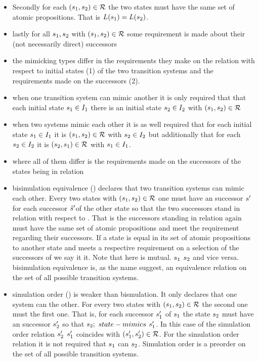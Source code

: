 \documentclass[preview]{standalone}
\begin{document}
\begin{itemize}
	\item Secondly for each $({s}_1, {s}_2) \in {\mathcal{R}}$ the two states must have the same set of atomic propositions. That is ${L}({s}_1) = {L}({s}_2)$.
	\item lastly for all ${s}_1, {s}_2$ with $({s}_1, {s}_2) \in {\mathcal{R}}$ some requirement is made about their (not necessarily direct) successors
	\item the mimicking types differ in the requirements they make on the relation \mimicrel with respect to initial states (1) of the two transition systems and the requirements made on the successors (2).
	\item when one transition system can mimic another it is only required that that each initial state ${s}_1 \in {I}_1$ there is an initial state ${s}_2 \in {I}_2$ with $({s}_1,{s}_2) \in {\mathcal{R}}$
	\item when two systems mimic each other it is as well required that for each initial state ${s}_1 \in {I}_1$ it is $({s}_1, {s}_2) \in {\mathcal{R}}$ with ${s}_2 \in {I}_2$ but additionally that for each ${s}_2 \in {I}_2$ it is $({s}_2, {s}_1) \in {\mathcal{R}}$ with ${s}_1 \in {I}_1$.
	\item where all of them differ is the requirements made on the successors of the states being in relation
	\item bisimulation equivalence (\bisimeq) declares that two transition systems can mimic each other. Every two states with $({s}_1, {s}_2) \in {\mathcal{R}}$ one must have an successor ${s}'$ for each successor ${\tilde{{s}}}'$of the other state so that the two successors stand in relation with respect to \mimicrel. That is the successors standing in relation again must have the same set of atomic propositions and meet the requirement regarding their successors. If a state \state is equal in its set of atomic propositions to another state \smstate and meets a respective requirement on a selection of the successors of \smstate we say it \stmimicsN it. Note that here \stmimickingN is mutual. ${s}_1$ \stmimicsN ${s}_2$ and vice versa.  bisimulation equivalence is, as the name suggest, an equivalence relation on the set of all possible transition systems.
	\item simulation order (\simorder) is weaker than bismulation. It only declares that one system can \stmimicN the other. For every two states with $({s}_1, {s}_2) \in {\mathcal{R}}$ the second one must \stmimicN the first one. That is, for each successor ${s}_1'$ of ${s}_1$ the state ${s}_2$ must have an successor ${s}_2'$ so that ${s}_2;$ $state-mimics$ ${s}_1'$. In this case of the simulation order relation ${s}_2'$ \stmimickingN ${s}_1'$ coincides with $({s}_1', {s}_2') \in {\mathcal{R}}$. For the simulation order relation it is not required that ${s}_1$ can \stmimicN ${s}_2$. Simulation order is a preorder on the set of all possible transition systems.

\end{itemize}
\end{document}
